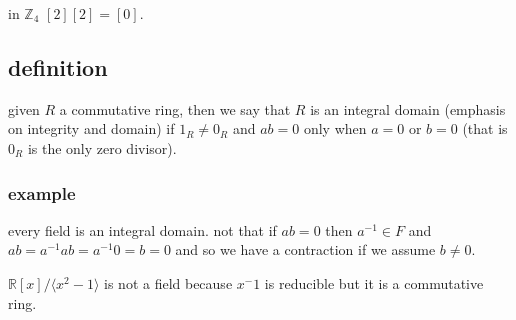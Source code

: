 \documentclass[letterpaper]{article}
\begin{document}
in $\mathbb{Z}_4$ $[2][2]=[0]$.

\subsection*{definition}
given $R$ a commutative ring, then we say that $R$ is an integral domain (emphasis on integrity and domain) if $1_R\ne 0_R$ and $ab=0$ only when $a=0$ or $b=0$ (that is $0_R$ is the only zero divisor).

\subsubsection*{example}
every field is an integral domain. not that if $ab=0$  then $a^{-1}\in F$ and $ab=a^{-1}ab=a^{-1}0=b=0$ and so we have a contraction if we assume $b\ne 0$.

$\mathbb{R}[x]/\langle x^2-1\rangle$ is not a field because $x^-1$ is reducible but it is a commutative ring.
\end{document}
